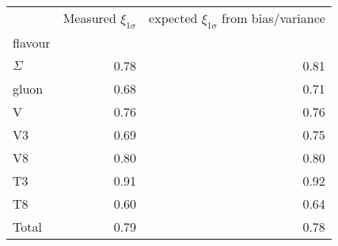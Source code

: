 \begin{center}
    \begin{tabular}{lrr}
        \toprule
        {} &  Measured $\xi_{1\sigma}$ & expected $\xi_{1\sigma}$ from bias/variance \\
        flavour  &                           &                           \\
        \midrule
        $\Sigma$ &                      0.78 &                      0.81 \\
        gluon    &                      0.68 &                      0.71 \\
        V        &                      0.76 &                      0.76 \\
        V3       &                      0.69 &                      0.75 \\
        V8       &                      0.80 &                      0.80 \\
        T3       &                      0.91 &                      0.92 \\
        T8       &                      0.60 &                      0.64 \\
        Total    &                      0.79 &                      0.78 \\
        \bottomrule
        \end{tabular}
\end{center}
